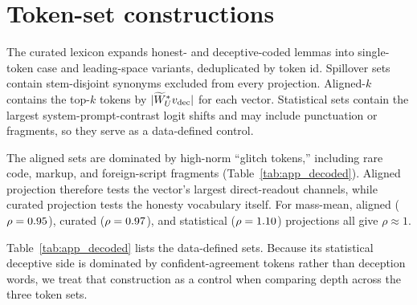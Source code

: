 \section{Token-set constructions}\label{app:tokens}

The curated lexicon expands honest- and deceptive-coded lemmas into single-token case and leading-space variants, deduplicated by token id. Spillover sets contain stem-disjoint synonyms excluded from every projection. Aligned-$k$ contains the top-$k$ tokens by $|\widetilde{W}_{U}^{*}v_{\mathrm{dec}}|$ for each vector. Statistical sets contain the largest system-prompt-contrast logit shifts and may include punctuation or fragments, so they serve as a data-defined control.

The aligned sets are dominated by high-norm ``glitch tokens,'' including rare code, markup, and foreign-script fragments (Table~\ref{tab:app_decoded}). Aligned projection therefore tests the vector's largest direct-readout channels, while curated projection tests the honesty vocabulary itself. For mass-mean, aligned ($\rho = 0.95$), curated ($\rho = 0.97$), and statistical ($\rho = 1.10$) projections all give $\rho \approx 1$.

\begin{table}[h]
\centering
\small
\begin{minipage}{\textwidth}

\end{minipage}
\caption{Full curated and spillover token surface forms. Apparent duplicate strings distinguish tokenizer forms with and without a leading space; spillover forms are held out of every projection.}
\label{tab:app_lexicon}
\end{table}
\FloatBarrier

Table~\ref{tab:app_decoded} lists the data-defined sets. Because its statistical deceptive side is dominated by confident-agreement tokens rather than deception words, we treat that construction as a control when comparing depth across the three token sets.

\par\addvspace{\paperfloattextsep}
\begingroup
\small
\noindent\par
{}
\label{tab:app_decoded}
\endgroup
\par\addvspace{\paperfloattextsep}

